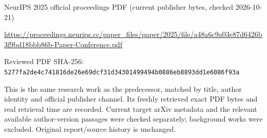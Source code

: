 \documentclass[11pt]{article}
\begin{document}
NeurIPS 2025 official proceedings PDF (current publisher bytes, checked 2026-10-21)

\url{https://proceedings.neurips.cc/paper_files/paper/2025/file/a48a6c9a03e87d6426b3f9bd18bbb86b-Paper-Conference.pdf}

Reviewed PDF SHA-256: \nolinkurl{5277fa2de4c741816de26e69dcf31d34301499494b0886eb8893dd1e6086f93a}

This is the same research work as the predecessor, matched by title, author identity and official publisher channel. Its freshly retrieved exact PDF bytes and real retrieval time are recorded. Current target arXiv metadata and the relevant available author-version passages were checked separately; background works were excluded. Original report/source history is unchanged.
\end{document}
